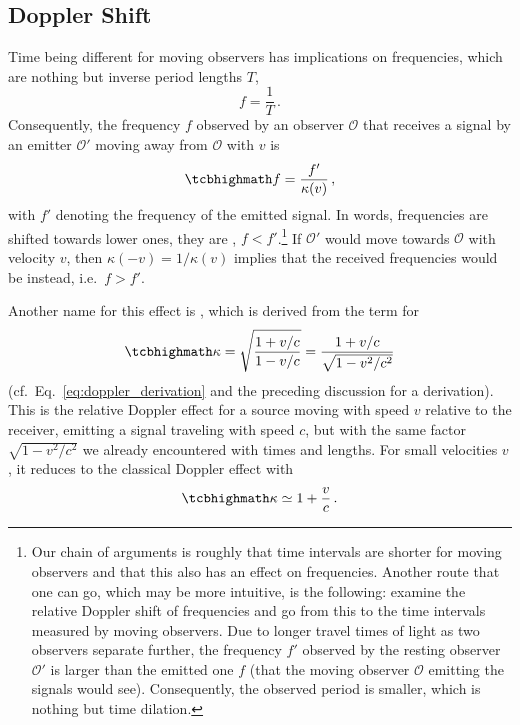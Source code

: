 \documentclass[../relativity_main.tex]{subfiles}
\begin{document}
		\subsection{Doppler Shift}
		\label{subsec:doppler}
Time being different for moving observers has implications on frequencies, which are nothing but inverse period lengths $T$,
\begin{equation}
	f = \frac{1}{T} \, .
\end{equation}
Consequently, the frequency $f$ observed by an observer $\mathcal{O}$ that receives a signal by an emitter $\mathcal{O}'$ moving away from $\mathcal{O}$ with $v$ is
\begin{equation}
	\eqbox{f = \frac{f'}{\kappa(v)}} \, ,
\end{equation}
with $f'$ denoting the frequency of the emitted signal. In words, frequencies are shifted towards lower ones, they are , $f < f'$.\footnote{Our chain of arguments is roughly that time intervals are shorter for moving observers and that this also has an effect on frequencies. Another route that one can go, which may be more intuitive, is the following: examine the relative Doppler shift of frequencies and go from this to the time intervals measured by moving observers. Due to longer travel times of light as two observers separate further, the frequency $f'$ observed by the resting observer $\mathcal{O}'$ is larger than the emitted one $f$ (that the moving observer $\mathcal{O}$ emitting the signals would see). Consequently, the observed period is smaller, which is nothing but time dilation.
}
If $\mathcal{O}'$ would move towards $\mathcal{O}$ with velocity $v$, then $\kappa(-v) = 1 / \kappa(v)$ implies that the received frequencies would be  instead, i.e.~$f > f'$.


Another name for this effect is , which is derived from the term  for
\begin{equation}\label{eq:doppler_factor}
	\eqbox{\kappa = \sqrt{\frac{1 + v / c}{1 - v / c}} = \frac{1 + v / c}{\sqrt{1 - v^2 / c^2}}}
\end{equation}
(cf.~Eq.~\eqref{eq:doppler_derivation} and the preceding discussion for a derivation). This is the relative Doppler effect for a source moving with speed $v$ relative to the receiver, emitting a signal traveling with speed $c$, but with the same factor $\sqrt{1 - v^2 / c^2}$ we already encountered with times and lengths. For small velocities $v$, it reduces to the classical Doppler effect with
\begin{equation}\label{eq:doppler_class}
	\eqbox{\kappa \simeq 1 + \frac{v}{c}} \, .
\end{equation}
\end{document}
